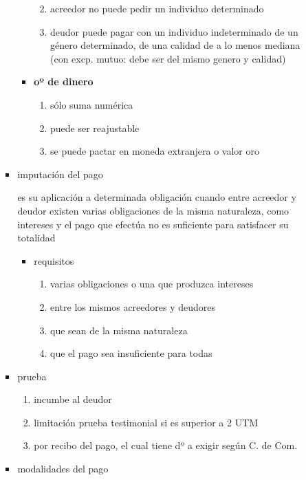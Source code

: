 \documentclass[]{article}
\providecommand{\tightlist}{%
  \setlength{\itemsep}{0pt}\setlength{\parskip}{0pt}}
\begin{document}
\begin{itemize}
\begin{itemize}
\begin{itemize}
\begin{itemize}
        \begin{enumerate}
        \def\labelenumi{\arabic{enumi}.}
        \tightlist
        \item
          acreedor no puede pedir un individuo determinado
        \item
          deudor puede pagar con un individuo indeterminado de un género
          determinado, de una calidad de a lo menos mediana (con excp.
          mutuo: debe ser del mismo genero y calidad)
        \end{enumerate}
      \item
        \textbf{oº de dinero}

        \begin{enumerate}
        \def\labelenumi{\arabic{enumi}.}
        \tightlist
        \item
          sólo suma numérica
        \item
          puede ser reajustable
        \item
          se puede pactar en moneda extranjera o valor oro
        \end{enumerate}
      \end{itemize}
    \item
      imputación del pago

      es su aplicación a determinada obligación cuando entre acreedor y
      deudor existen varias obligaciones de la misma naturaleza, como
      intereses y el pago que efectúa no es suficiente para satisfacer
      su totalidad

      \begin{itemize}
      \tightlist
      \item
        requisitos

        \begin{enumerate}
        \def\labelenumi{\arabic{enumi}.}
        \tightlist
        \item
          varias obligaciones o una que produzca intereses
        \item
          entre los mismos acreedores y deudores
        \item
          que sean de la misma naturaleza
        \item
          que el pago sea insuficiente para todas
        \end{enumerate}
      \end{itemize}
    \item
      prueba

      \begin{enumerate}
      \def\labelenumi{\arabic{enumi}.}
      \tightlist
      \item
        incumbe al deudor
      \item
        limitación prueba testimonial si es superior a 2 UTM
      \item
        por recibo del pago, el cual tiene dº a exigir según C. de Com.
      \end{enumerate}
    \item
      modalidades del pago


\end{itemize}
\end{itemize}
\end{itemize}
\end{document}

